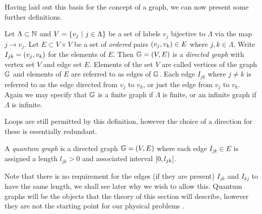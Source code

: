 Having laid out this basis for the concept of a graph, we can now present some further definitions.
\begin{definition} \label{def:DirectedGraph}
	Let $\Lambda\subset\mathbb{N}$ and $V=\left\{ v_j \ \vert \ j\in\Lambda \right\}$ be a set of labels $v_j$ bijective to $\Lambda$ via the map $j\rightarrow v_j$.
	Let $E\subset V\times V$ be a set of \textit{ordered} pairs $\left( v_j,v_k \right)\in E$ where $j,k\in\Lambda$.
	Write $I_{jk} = \left( v_j,v_k \right)$ for the elements of $E$.
	Then $\mathbb{G}=\left( V,E \right)$ is a \textit{directed graph} with vertex set $V$ and edge set $E$.
	Elements of the set $V$ are called vertices of the graph $\mathbb{G}$ and elements of $E$ are referred to as edges of $\mathbb{G}$.
	Each edge $I_{jk}$ where $j\neq k$ is referred to as the edge directed from $v_j$ to $v_k$, or just the edge from $v_j$ to $v_k$. \newline
	Again we may specify that $\mathbb{G}$ is a finite graph if $\Lambda$ is finite, or an infinite graph if $\Lambda$ is infinite.
\end{definition}
Loops are still permitted by this definition, however the choice of a direction for these is essentially redundant.
\begin{definition} \label{def:QuantumGraph}
	A \textit{quantum graph} is a directed graph $\mathbb{G} = \left( V,E \right)$ where each edge $I_{jk}\in E$ is assigned a length $l_{jk}>0$ and associated interval $\left[ 0,l_{jk} \right]$.
\end{definition}
Note that there is no requirement for the edges (if they are present) $I_{jk}$ and $I_{kj}$ to have the same length, we shall see later why we wish to allow this.
Quantum graphs will be the objects that the theory of this section will describe, however they are not the starting point for our physical problems . \newline

